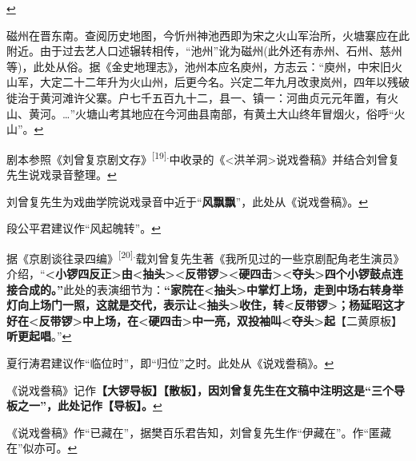   \protect\hyperlink{fnref469}{↩}
\item
  \leavevmode\hypertarget{fn470}{}%
  磁州在晋东南。查阅历史地图，今忻州神池西即为宋之火山军治所，火塘寨应在此附近。由于过去艺人口述辗转相传，``池州''讹为磁州(此外还有赤州、石州、慈州等)，此处从俗。据《金史地理志》，池州本应名庾州，方志云：``庾州，中宋旧火山军，大定二十二年升为火山州，后更今名。兴定二年九月改隶岚州，四年以残破徙治于黄河滩许父寨。户七千五百九十二，县一、镇一：河曲贞元元年置，有火山、黄河。\ldots{}''火塘山考其地应在今河曲县南部，有黄土大山终年冒烟火，俗呼``火山''。\protect\hyperlink{fnref470}{↩}
\item
  \leavevmode\hypertarget{fn471}{}%
  剧本参照《刘曾复京剧文存》\textsuperscript{{[}19{]}.}中收录的《\textless{}洪羊洞\textgreater{}说戏誊稿》并结合刘曾复先生说戏录音整理。\protect\hyperlink{fnref471}{↩}
\item
  \leavevmode\hypertarget{fn472}{}%
  刘曾复先生为戏曲学院说戏录音中近于``\textbf{风飘飘}''，此处从《说戏誊稿》。\protect\hyperlink{fnref472}{↩}
\item
  \leavevmode\hypertarget{fn473}{}%
  段公平君建议作``风起魄转''。\protect\hyperlink{fnref473}{↩}
\item
  \leavevmode\hypertarget{fn474}{}%
  据《京剧谈往录四编》\textsuperscript{{[}20{]}.}载刘曾复先生著《我所见过的一些京剧配角老生演员》介绍，``\textbf{\textless{}小锣四反正\textgreater{}由\textless{}抽头\textgreater{}\textless{}反带锣\textgreater{}\textless{}硬四击\textgreater{}\textless{}夺头\textgreater{}四个小锣鼓点连接合成的。''}此处的表演细节为：\textbf{``家院在\textless{}抽头\textgreater{}中掌灯上场，走到中场右转身举灯向上场门一照，这就是交代，表示让\textless{}抽头\textgreater{}收住，转\textless{}反带锣\textgreater{}；杨延昭这才好在\textless{}反带锣\textgreater{}中上场，在\textless{}硬四击\textgreater{}中一亮，双投袖叫\textless{}夺头\textgreater{}起}【二黄原板】\textbf{听更起唱}。''\protect\hyperlink{fnref474}{↩}
\item
  \leavevmode\hypertarget{fn475}{}%
  夏行涛君建议作``临位时''，即``归位''之时。此处从《说戏誊稿》。\protect\hyperlink{fnref475}{↩}
\item
  \leavevmode\hypertarget{fn476}{}%
  《说戏誊稿》记作\textbf{【大锣导板】【散板】，因刘曾复先生在文稿中注明这是``三个导板之一''，此处记作【导板】。}\protect\hyperlink{fnref476}{↩}
\item
  \leavevmode\hypertarget{fn477}{}%
  《说戏誊稿》作``已藏在''，据樊百乐君告知，刘曾复先生作``伊藏在''。作``匿藏在''似亦可。\protect\hyperlink{fnref477}{↩}
\item
